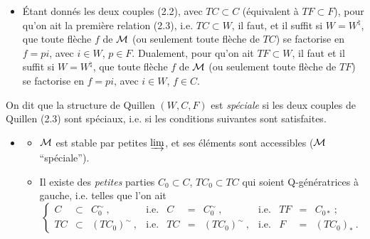 \begin{itemize}[leftmargin=4em]
\item[(2.5)] Étant donnés les deux couples (2.2), avec $TC \subset C$ (équivalent à $TF \subset F$), pour qu'on ait la première relation (2.3), i.e. $TC \subset W$, il faut, et il suffit si $W = W^{\natural}$, que toute flèche $f$ de $\mathcal{M}$ (ou seulement toute flèche de $TC$) se factorise en $f = pi$, avec $i \in W$, $p \in F$. Dualement, pour qu'on ait $TF \subset W$, il faut et il suffit si $W = W^{\natural}$, que toute flèche $f$ de $\mathcal{M}$ (ou seulement toute flèche de $TF$) se factorise en $f = pi$, avec $i \in W$, $f \in C$. %
\end{itemize}

On dit que la structure de Quillen $(W,C,F)$ est \textit{spéciale} si les deux couples de Quillen (2.3) sont spéciaux, i.e. si les conditions suivantes sont satisfaites.

\begin{itemize}[leftmargin=4em]
\item[(2.6)]
\begin{itemize}
\item[a)] $\mathcal{M}$ est stable par petites $\varinjlim$, et ses éléments sont accessibles ($\mathcal{M}$ “spéciale”).
\item[b)] Il existe des \textit{petites} parties $C_0 \subset C$, $TC_0 \subset TC$ qui soient Q-génératrices à gauche, i.e. telles que l'on ait
\[
\left\{
\begin{array}{rclcrclcrcl}
C & \subset & C_0^{\sim}\ , & \text{i.e.} & C & = & C_0^{\sim}\ , & \text{i.e.} & TF & = & C_{0*}\ ;\\
TC & \subset & (TC_0)^{\sim}\ , & \text{i.e.} & TC & = & (TC_0)^{\sim}\ , & \text{i.e.} & F & = & (TC_0)_*\ .
\end{array}\right. %
\]
\end{itemize}
\end{itemize}

